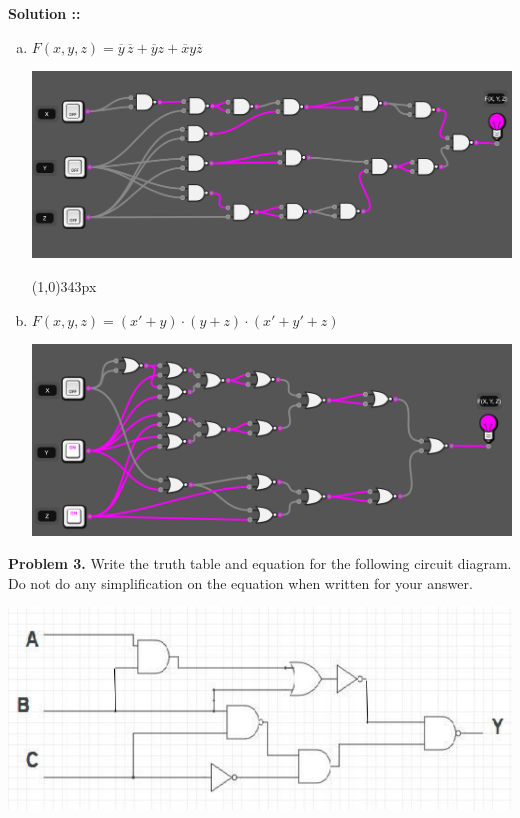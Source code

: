 \documentclass[11pt]{article}
\begin{document}
\vspace{5px}\textbf{Solution ::}
\begin{enumerate}[a)]
    \item
    $F(x,y,z)=\overline{y}\,\overline{z} + \overline{y}z + \overline{x}y\overline{z}$
    \begin{center}
        \includegraphics[scale=0.42]{2a.png}
    \end{center}
    \line(1,0){343px}

    \item
    $F(x,y,z) = (x' + y)\cdot(y+z)\cdot(x'+y'+z)$
    \begin{center}
        \includegraphics[scale=0.294]{2b.png}
    \end{center}
\end{enumerate}

\pagebreak


\textbf{Problem 3.} Write the truth table and equation for the following circuit
diagram. Do not do any simplification on the equation when written for your answer.
\begin{center}
    \includegraphics[scale=0.7]{3.png}
\end{center}
\end{document}
